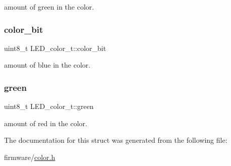 amount of green in the color. \hypertarget{struct_l_e_d__color__t_ae24077cc2ae26c649bb6a6a07273e86e}{}\label{struct_l_e_d__color__t_ae24077cc2ae26c649bb6a6a07273e86e} 
\subsubsection{\texorpdfstring{color\+\_\+bit}{color\_bit}}
{\footnotesize\ttfamily uint8\+\_\+t L\+E\+D\+\_\+color\+\_\+t\+::color\+\_\+bit}

amount of blue in the color. \hypertarget{struct_l_e_d__color__t_a48151ec2a427af0f3343e7eb10fb929a}{}\label{struct_l_e_d__color__t_a48151ec2a427af0f3343e7eb10fb929a} 
\subsubsection{\texorpdfstring{green}{green}}
{\footnotesize\ttfamily uint8\+\_\+t L\+E\+D\+\_\+color\+\_\+t\+::green}

amount of red in the color. 

The documentation for this struct was generated from the following file\+:\begin{DoxyCompactItemize}
\item 
firmware/\hyperlink{color_8h}{color.\+h}\end{DoxyCompactItemize}
